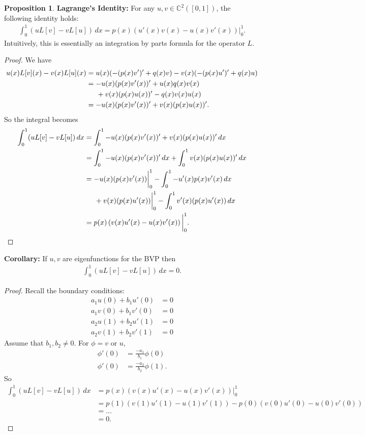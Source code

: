 \documentclass{book}
\theoremstyle{definition}
\newtheorem{prop}{Proposition}[section]
\begin{document}
\begin{prop}
	\textbf{Lagrange's Identity:} For any $u,v \in \mathbb{C}^2([0,1])$, the following identity holds:
	\begin{align*}
	\int^1_0 (uL[v] - vL[u])\,dx = p(x)\left( u'(x)v(x) - u(x)v'(x) \right)\bigg\vert^1_0.
	\end{align*}
	Intuitively, this is essentially an integration by parts formula for the operator $L$.
	
	
	\begin{proof}
		We have
		\begin{align*}
		u(x)L[v](x) - v(x)L[u](x) &= u(x)(-(p(x)v')' + q(x)v) - v(x)(-(p(x)u')' + q(x)u)\\
		&= -u(x)(p(x)v'(x))' + u(x)q(x)v(x)\\ &\hspace{0.5cm}+ v(x)(p(x)u(x))' - q(x)v(x)u(x)\\
		&= -u(x)(p(x)v'(x))' + v(x)(p(x)u(x))'.
		\end{align*}
		So the integral becomes
		\begin{align*}
		\int^1_0 (uL[v] - vL[u])\,dx &= \int^1_0 -u(x)(p(x)v'(x))' + v(x)(p(x)u(x))'\,dx\\
		&= \int^1_0 -u(x)(p(x)v'(x))' \,dx    + \int^1_0 v(x)(p(x)u(x))' \,dx\\
		&= -u(x)(p(x)v'(x))\bigg\vert^1_0 - \int^1_0 -u'(x)p(x)v'(x)\,dx\\ &\hspace{0.5cm}+v(x)(p(x)u'(x))\bigg\vert^1_0 - \int^1_0 v'(x)(p(x)u'(x))\,dx\\
		&= p(x)\left(v(x)u'(x) - u(x)v'(x)\right)\bigg\vert^1_0.
		\end{align*}
	\end{proof}
\end{prop}

\textbf{Corollary:} If $u,v$ are eigenfunctions for the BVP then
\begin{align*}
\int_0^1 (uL[v] - vL[u])\,dx = 0.
\end{align*}
\begin{proof}
	Recall the boundary conditions: 
	\begin{align*}
	a_1u(0) + b_1u'(0) &= 0\\
	a_1v(0) + b_1v'(0) &= 0\\
	a_2u(1) + b_2u'(1) &= 0\\
	a_2v(1) + b_2v'(1) &= 0
	\end{align*}
	Assume that $b_1,b_2\neq 0$. For $\phi = v$ or $u$,
	\begin{align*}
	\phi'(0) &= \frac{-a_1}{b_1}\phi(0)\\
	\phi'(0) &= \frac{-a_2}{b_2}\phi(1).
	\end{align*}
	So
	\begin{align*}
	\int_0^1 (uL[v] - vL[u])\,dx &= p(x)\left(v(x)u'(x) - u(x)v'(x)\right)\bigg\vert^1_0\\
	&= p(1)\left(v(1)u'(1) - u(1)v'(1)\right) - p(0)\left(v(0)u'(0) - u(0)v'(0)\right)\\
	&=\dots\\
	&= 0.
	\end{align*}
\end{proof}
\end{document}
